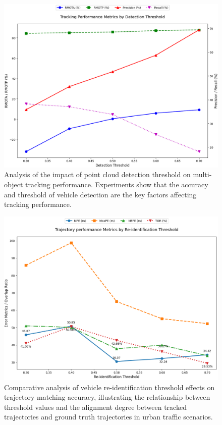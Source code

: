 \documentclass[lettersize,journal]{IEEEtran}
\begin{document}
\begin{figure}[t]
	\centering
	\includegraphics[width=\linewidth]{picture/picture6.png} 
	\caption{Analysis of the impact of point cloud detection threshold on multi-object tracking performance. Experiments show that the accuracy and threshold of vehicle detection are the key factors affecting tracking performance.} 
	\label{fig:6} 
\end{figure}

\begin{figure}[t]
	\centering
	\includegraphics[width=\linewidth]{picture/picture7.png} 
	\caption{Comparative analysis of vehicle re-identification threshold effects on trajectory matching accuracy, illustrating the relationship between threshold values and the alignment degree between tracked trajectories and ground truth trajectories in urban traffic scenarios.} 
	\label{fig:7} 
\end{figure}
\end{document}

